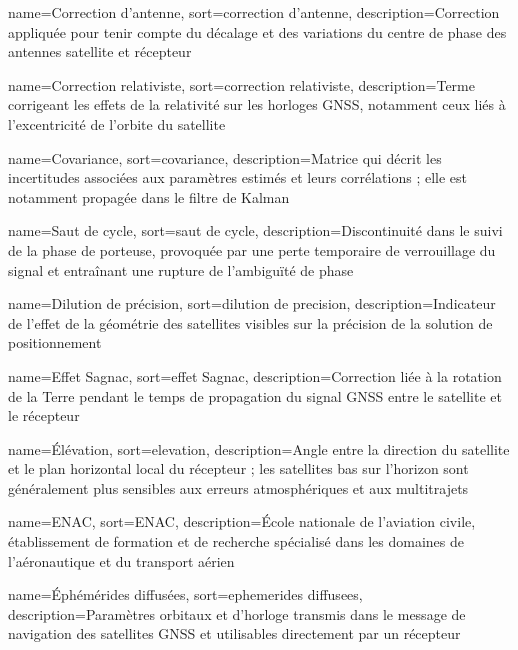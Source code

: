 {
    name={Correction d'antenne},
    sort={correction d'antenne},
    description={Correction appliquée pour tenir compte du décalage et des variations du centre de phase des antennes satellite et récepteur}
}

{
    name={Correction relativiste},
    sort={correction relativiste},
    description={Terme corrigeant les effets de la relativité sur les horloges GNSS, notamment ceux liés à l'excentricité de l'orbite du satellite}
}

{
    name={Covariance},
    sort={covariance},
    description={Matrice qui décrit les incertitudes associées aux paramètres estimés et leurs corrélations ; elle est notamment propagée dans le filtre de Kalman}
}

{
    name={Saut de cycle},
    sort={saut de cycle},
    description={Discontinuité dans le suivi de la phase de porteuse, provoquée par une perte temporaire de verrouillage du signal et entraînant une rupture de l'ambiguïté de phase}
}

{
    name={Dilution de précision},
    sort={dilution de precision},
    description={Indicateur de l'effet de la géométrie des satellites visibles sur la précision de la solution de positionnement}
}

{
    name={Effet Sagnac},
    sort={effet Sagnac},
    description={Correction liée à la rotation de la Terre pendant le temps de propagation du signal GNSS entre le satellite et le récepteur}
}

{
    name={Élévation},
    sort={elevation},
    description={Angle entre la direction du satellite et le plan horizontal local du récepteur ; les satellites bas sur l'horizon sont généralement plus sensibles aux erreurs atmosphériques et aux multitrajets}
}

{
    name={ENAC},
    sort={ENAC},
    description={École nationale de l'aviation civile, établissement de formation et de recherche spécialisé dans les domaines de l'aéronautique et du transport aérien}
}

{
    name={Éphémérides diffusées},
    sort={ephemerides diffusees},
    description={Paramètres orbitaux et d'horloge transmis dans le message de navigation des satellites GNSS et utilisables directement par un récepteur}
}


